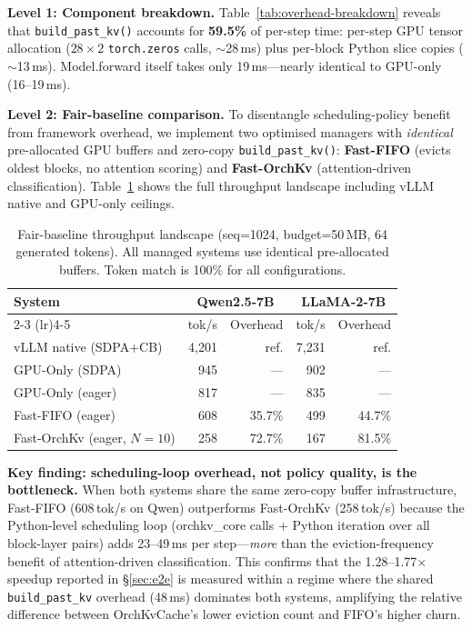 \documentclass[conference]{IEEEtran}
\begin{document}
\textbf{Level 1: Component breakdown.} Table~\ref{tab:overhead-breakdown} reveals that \texttt{build\_past\_kv()} accounts for \textbf{59.5\%} of per-step time: per-step GPU tensor allocation ($28{\times}2$ \texttt{torch.zeros} calls, ${\sim}$28\,ms) plus per-block Python slice copies (${\sim}$13\,ms). Model.forward itself takes only 19\,ms---nearly identical to GPU-only (16--19\,ms).

\textbf{Level 2: Fair-baseline comparison.} To disentangle scheduling-policy benefit from framework overhead, we implement two optimised managers with \emph{identical} pre-allocated GPU buffers and zero-copy \texttt{build\_past\_kv()}: \textbf{Fast-FIFO} (evicts oldest blocks, no attention scoring) and \textbf{Fast-OrchKv} (attention-driven classification). Table~\ref{tab:fair-baseline} shows the full throughput landscape including vLLM native and GPU-only ceilings.

\begin{table}[t]
\centering
\caption{Fair-baseline throughput landscape (seq=1024, budget=50\,MB, 64 generated tokens). All managed systems use identical pre-allocated buffers. Token match is 100\% for all configurations.}
\label{tab:fair-baseline}
\small
\begin{tabular}{@{}lrrrr@{}}
\toprule
System & \multicolumn{2}{c}{Qwen2.5-7B} & \multicolumn{2}{c}{LLaMA-2-7B} \\
\cmidrule(lr){2-3} \cmidrule(lr){4-5}
 & tok/s & Overhead & tok/s & Overhead \\
\midrule
vLLM native (SDPA+CB) & 4{,}201 & ref. & 7{,}231 & ref. \\
GPU-Only (SDPA)    & 945 & --- & 902 & ---  \\
GPU-Only (eager)   & 817 & --- & 835 & ---  \\
Fast-FIFO (eager)  & 608 & 35.7\% & 499 & 44.7\% \\
Fast-OrchKv (eager, $N{=}10$)  & 258 & 72.7\% & 167 & 81.5\% \\
\bottomrule
\end{tabular}
\end{table}

\textbf{Key finding: scheduling-loop overhead, not policy quality, is the bottleneck.}
When both systems share the same zero-copy buffer infrastructure, Fast-FIFO (608\,tok/s on Qwen) outperforms Fast-OrchKv (258\,tok/s) because the Python-level scheduling loop (orchkv\_core calls + Python iteration over all block-layer pairs) adds 23--49\,ms per step---\emph{more} than the eviction-frequency benefit of attention-driven classification. This confirms that the 1.28--1.77$\times$ speedup reported in \S\ref{sec:e2e} is measured within a regime where the shared \texttt{build\_past\_kv} overhead (48\,ms) dominates both systems, amplifying the relative difference between OrchKvCache's lower eviction count and FIFO's higher churn.
\end{document}
